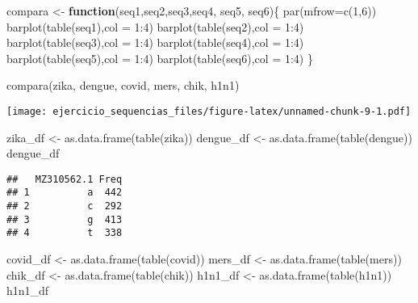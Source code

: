 \documentclass[
]{article}
\newenvironment{Shaded}{\begin{snugshade}}{\end{snugshade}}
\newcommand{\AttributeTok}[1]{\textcolor[rgb]{0.77,0.63,0.00}{#1}}
\newcommand{\ControlFlowTok}[1]{\textcolor[rgb]{0.13,0.29,0.53}{\textbf{#1}}}
\newcommand{\DecValTok}[1]{\textcolor[rgb]{0.00,0.00,0.81}{#1}}
\newcommand{\FunctionTok}[1]{\textcolor[rgb]{0.00,0.00,0.00}{#1}}
\newcommand{\NormalTok}[1]{#1}
\newcommand{\OtherTok}[1]{\textcolor[rgb]{0.56,0.35,0.01}{#1}}
\newcommand{\SpecialCharTok}[1]{\textcolor[rgb]{0.00,0.00,0.00}{#1}}
\begin{document}
\begin{Shaded}
\begin{Highlighting}[]
\NormalTok{compara }\OtherTok{\textless{}{-}} \ControlFlowTok{function}\NormalTok{(seq1,seq2,seq3,seq4, seq5, seq6)\{}
  \FunctionTok{par}\NormalTok{(}\AttributeTok{mfrow=}\FunctionTok{c}\NormalTok{(}\DecValTok{1}\NormalTok{,}\DecValTok{6}\NormalTok{))}
  \FunctionTok{barplot}\NormalTok{(}\FunctionTok{table}\NormalTok{(seq1),}\AttributeTok{col =} \DecValTok{1}\SpecialCharTok{:}\DecValTok{4}\NormalTok{)}
  \FunctionTok{barplot}\NormalTok{(}\FunctionTok{table}\NormalTok{(seq2),}\AttributeTok{col =} \DecValTok{1}\SpecialCharTok{:}\DecValTok{4}\NormalTok{)}
  \FunctionTok{barplot}\NormalTok{(}\FunctionTok{table}\NormalTok{(seq3),}\AttributeTok{col =} \DecValTok{1}\SpecialCharTok{:}\DecValTok{4}\NormalTok{)}
  \FunctionTok{barplot}\NormalTok{(}\FunctionTok{table}\NormalTok{(seq4),}\AttributeTok{col =} \DecValTok{1}\SpecialCharTok{:}\DecValTok{4}\NormalTok{)}
  \FunctionTok{barplot}\NormalTok{(}\FunctionTok{table}\NormalTok{(seq5),}\AttributeTok{col =} \DecValTok{1}\SpecialCharTok{:}\DecValTok{4}\NormalTok{)}
  \FunctionTok{barplot}\NormalTok{(}\FunctionTok{table}\NormalTok{(seq6),}\AttributeTok{col =} \DecValTok{1}\SpecialCharTok{:}\DecValTok{4}\NormalTok{)}
\NormalTok{\}}

\FunctionTok{compara}\NormalTok{(zika, dengue, covid, mers, chik, h1n1)}
\end{Highlighting}
\end{Shaded}

\texttt{[image: ejercicio\_sequencias\_files/figure-latex/unnamed-chunk-9-1.pdf]}

\begin{Shaded}
\begin{Highlighting}[]
\NormalTok{zika\_df }\OtherTok{\textless{}{-}} \FunctionTok{as.data.frame}\NormalTok{(}\FunctionTok{table}\NormalTok{(zika))}
\NormalTok{dengue\_df }\OtherTok{\textless{}{-}} \FunctionTok{as.data.frame}\NormalTok{(}\FunctionTok{table}\NormalTok{(dengue))}
\NormalTok{dengue\_df}
\end{Highlighting}
\end{Shaded}

\begin{verbatim}
##   MZ310562.1 Freq
## 1          a  442
## 2          c  292
## 3          g  413
## 4          t  338
\end{verbatim}

\begin{Shaded}
\begin{Highlighting}[]
\NormalTok{covid\_df }\OtherTok{\textless{}{-}} \FunctionTok{as.data.frame}\NormalTok{(}\FunctionTok{table}\NormalTok{(covid))}
\NormalTok{mers\_df }\OtherTok{\textless{}{-}} \FunctionTok{as.data.frame}\NormalTok{(}\FunctionTok{table}\NormalTok{(mers))}
\NormalTok{chik\_df }\OtherTok{\textless{}{-}} \FunctionTok{as.data.frame}\NormalTok{(}\FunctionTok{table}\NormalTok{(chik))}
\NormalTok{h1n1\_df }\OtherTok{\textless{}{-}} \FunctionTok{as.data.frame}\NormalTok{(}\FunctionTok{table}\NormalTok{(h1n1))}
\NormalTok{h1n1\_df}
\end{Highlighting}
\end{Shaded}
\end{document}
